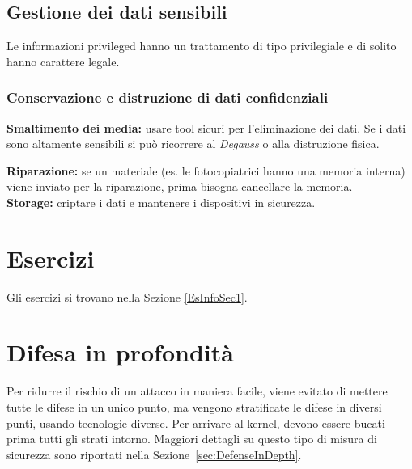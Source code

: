 \subsection{Gestione dei dati sensibili}

Le informazioni privileged hanno un trattamento di tipo privilegiale e di
solito hanno carattere legale.

\subsubsection{Conservazione e distruzione di dati confidenziali}

\textbf{Smaltimento dei media:} usare tool sicuri per l'eliminazione dei dati.
Se i dati sono altamente sensibili si può ricorrere al \textit{Degauss} o alla
distruzione fisica.\\
\newline

\textbf{Riparazione:} se un materiale (es. le fotocopiatrici hanno una memoria
interna) viene inviato per la riparazione, prima bisogna cancellare la memoria.
\\
\newline
\textbf{Storage:} criptare i dati e mantenere i dispositivi in sicurezza.

\section{Esercizi}

Gli esercizi si trovano nella Sezione \ref{EsInfoSec1}.


\section{Difesa in profondità}

Per ridurre il rischio di un attacco in maniera facile, viene evitato di
mettere tutte le difese in un unico punto, ma vengono stratificate le difese in
diversi punti, usando tecnologie diverse.
Per arrivare al kernel, devono essere bucati prima tutti gli strati intorno.
Maggiori dettagli su questo tipo di misura di sicurezza sono riportati
nella Sezione~\ref{sec:DefenseInDepth}.

